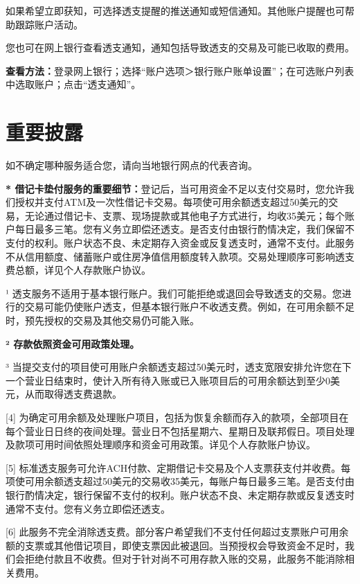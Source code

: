 \documentclass[UTF8,fontset=none,11pt,a4paper]{ctexart}
\begin{document}
如果希望立即获知，可选择透支提醒的推送通知或短信通知。其他账户提醒也可帮助跟踪\allowbreak\mbox{账户活动。}


您也可在网上银行查看透支通知，通知包括导致透支的交易及可能已收\allowbreak\mbox{取的费用。}


\textbf{查看方法：}登录网上银行；选择“账户选项＞银行账户账单设置”；在可选账户列表中选取账户；点击“\allowbreak\mbox{透支通知”。}


\section*{重要披露}
如不确定哪种服务适合您，请向当地银行网点的\allowbreak\mbox{代表咨询。}


\textbf{* 借记卡垫付服务的重要细节：}登记后，当可用资金不足以支付交易时，您允许我们授权并支付ATM及一次性借记卡交易。每项使可用余额透支超过50美元的交易，无论通过借记卡、支票、现场提款或其他电子方式进行，均收35美元；每个账户每日最多三笔。您有义务立即偿还透支。是否支付由银行酌情决定，我们保留不支付的权利。账户状态不良、未定期存入资金或反复透支时，通常不支付。此服务不从信用额度、储蓄账户或住房净值信用额度转入款项。交易处理顺序可影响透支费总额，详见个人存款\allowbreak\mbox{账户协议。}


¹ 透支服务不适用于基本银行账户。我们可能拒绝或退回会导致透支的交易。您进行的交易可能仍使账户透支，但基本银行账户不收透支费。例如，在可用余额不足时，预先授权的交易及其他交易仍\allowbreak\mbox{可能入账。}


\textbf{² 存款依照资金可用政策处理。}


³ 当提交支付的项目使可用账户余额透支超过50美元时，透支宽限安排允许您在下一个营业日结束时，使计入所有待入账或已入账项目后的可用余额达到至少0美元，从而取得透\allowbreak\mbox{支费退款。}


[4] 为确定可用余额及处理账户项目，包括为恢复余额而存入的款项，全部项目在每个营业日日终的夜间处理。营业日不包括星期六、星期日及联邦假日。项目处理及款项可用时间依照处理顺序和资金可用政策。详见个人存款\allowbreak\mbox{账户协议。}


[5] 标准透支服务可允许ACH付款、定期借记卡交易及个人支票获支付并收费。每项使可用余额透支超过50美元的交易收35美元，每账户每日最多三笔。是否支付由银行酌情决定，银行保留不支付的权利。账户状态不良、未定期存款或反复透支时通常不支付。您有义务立即\allowbreak\mbox{偿还透支。}


[6] 此服务不完全消除透支费。部分客户希望我们不支付任何超过支票账户可用余额的支票或其他借记项目，即使支票因此被退回。当预授权会导致资金不足时，我们会拒绝付款且不收费。但对于针对尚不可用存款入账的交易，此服务不能消除\allowbreak\mbox{相关费用。}
\end{document}
